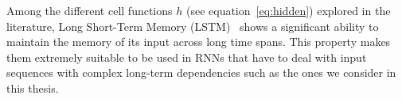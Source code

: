 
Among the different cell functions $h$ (see equation~\eqref{eq:hidden}) explored in the literature, Long Short-Term
Memory (LSTM)~\cite{hochreiter1997long} shows a significant ability to maintain the memory of its input across long time spans. This property makes them extremely suitable to be used in RNNs that have to deal with input sequences with complex long-term dependencies such as the ones we consider in this thesis.

